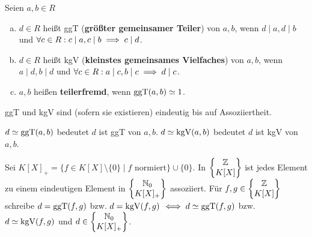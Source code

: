 \documentclass[a4paper]{report}
\begin{document}
\begin{defi}
  Seien $a, b \in R$
  \begin{enumerate}[(a)]
    \item $d \in R$ heißt ggT (\textbf{größter gemeinsamer Teiler}) von $a, b$, wenn $d \mid a, d \mid b$ und $\forall c \in R : c \mid a, c \mid b \implies c \mid d$.
    \item $d \in R$ heißt kgV (\textbf{kleinstes gemeinsames Vielfaches}) von $a, b$, wenn $a \mid d, b \mid d$ und $\forall c \in R: a \mid c, b \mid c \implies d \mid c$.
    \item $a, b$ heißen \textbf{teilerfremd}, wenn $\operatorname{ggT}(a, b) \simeq 1$.
  \end{enumerate}
\end{defi}

\begin{bem*}[Übung]
ggT und kgV sind (sofern sie existieren) eindeutig bis auf Assoziiertheit.
\end{bem*}
\begin{nota*}
$d \simeq \operatorname{ggT}(a, b)$ bedeutet $d$ ist ggT von $a, b$.
$d \simeq \operatorname{kgV}(a, b)$ bedeutet $d$ ist kgV von $a, b$.
\end{nota*}

\begin{kon}
  Sei $K[X]_{+} = \{f \in K[X] \setminus \{0\} \mid f \text{ normiert}\} \cup \{0\}$. In
  $\left\{ \begin{matrix}
          \mathbb{Z} \\ K[X]
        \end{matrix} \right\}$ ist jedes Element zu einem eindeutigen Element in
$\left\{ \begin{matrix}
          \mathbb{N}_0 \\ K[X]_{+}
        \end{matrix} \right\}$ assoziiert. Für $f, g \in \left\{ \begin{matrix}
          \mathbb{Z} \\ K[X]
        \end{matrix} \right\}$ schreibe $d = \operatorname{ggT}(f, g)$ bzw. $d = \operatorname{kgV}(f, g)$ $\iff d \simeq \operatorname{ggT}(f,g)$ bzw. $d \simeq \operatorname{kgV}(f,g)$ und $d \in \left\{ \begin{matrix}
          \mathbb{N}_0 \\ K[X]_{+}
        \end{matrix} \right\}$.
\end{kon}
\end{document}
